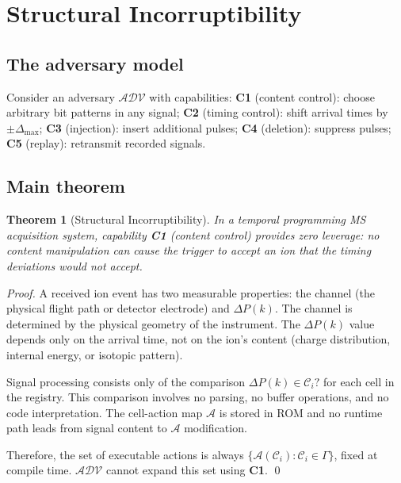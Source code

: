 \documentclass[twocolumn,10pt,a4paper]{article}
\theoremstyle{thmstyle}
\newtheorem{theorem}{Theorem}[section]
\theoremstyle{definition}
\theoremstyle{remark}
\newcommand{\DP}{\Delta P}
\newcommand{\calC}{\mathcal{C}}
\newcommand{\calA}{\mathcal{A}}
\begin{document}
\section{Structural Incorruptibility}
\label{sec:incorruptibility}

\subsection{The adversary model}

Consider an adversary $\mathcal{ADV}$ with capabilities:
\textbf{C1} (content control): choose arbitrary bit patterns in any signal;
\textbf{C2} (timing control): shift arrival times by $\pm\Delta_{\max}$;
\textbf{C3} (injection): insert additional pulses;
\textbf{C4} (deletion): suppress pulses;
\textbf{C5} (replay): retransmit recorded signals.

\subsection{Main theorem}

\begin{theorem}[Structural Incorruptibility]
\label{thm:incorruptibility}
In a temporal programming MS acquisition system, capability \textbf{C1}
(content control) provides zero leverage: no content manipulation can
cause the trigger to accept an ion that the timing deviations would
not accept.
\end{theorem}

\begin{proof}
A received ion event has two measurable properties: the channel
(the physical flight path or detector electrode) and $\DP(k)$. The
channel is determined by the physical geometry of the instrument. The
$\DP(k)$ value depends only on the arrival time, not on the ion's
content (charge distribution, internal energy, or isotopic pattern).

Signal processing consists only of the comparison
$\DP(k) \in \calC_i ?$ for each cell in the registry. This comparison
involves no parsing, no buffer operations, and no code interpretation.
The cell-action map $\calA$ is stored in ROM and no runtime path leads
from signal content to $\calA$ modification.

Therefore, the set of executable actions is always
$\{\calA(\calC_i): \calC_i \in \Gamma\}$, fixed at compile time.
$\mathcal{ADV}$ cannot expand this set using \textbf{C1}. \qed
\end{proof}
\end{document}

